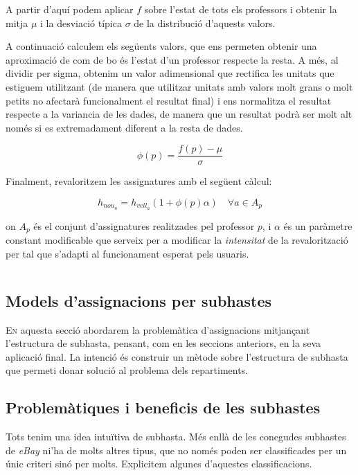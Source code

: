 \documentclass[10pt,twocolumn]{article}
\newcommand{\esp}{\text{ }}
\begin{document}
A partir d'aquí podem aplicar $f$ sobre l'estat de tots els professors i obtenir la mitja $\mu$ i la desviació típica $\sigma$ de la distribució d'aquests valors. 

A continuació calculem els següents valors, que ens permeten obtenir una aproximació de com de bo és l'estat d'un professor respecte la resta. A més, al dividir per sigma, obtenim un valor adimensional que rectifica les unitats que estiguem utilitzant (de manera que utilitzar unitats amb valors molt grans o molt petits no afectarà funcionalment el resultat final) i ens normalitza el resultat respecte a la variancia de les dades, de manera que un resultat podrà ser molt alt només si es extremadament diferent a la resta de dades.

$$\phi(p)=\dfrac{f(p)-\mu}{\sigma}$$

Finalment, revaloritzem les assignatures amb el següent càlcul:

$$h_{nou_a}=h_{vell_a}(1+\phi(p)\alpha) \quad \forall a \in A_p$$

on $A_p$ és el conjunt d'assignatures realitzades pel professor $p$, i $\alpha$ és un paràmetre constant modificable que serveix per a modificar la \textit{intensitat} de la revalorització per tal que s'adapti al funcionament esperat pels usuaris.


\newpage
$$
\esp
$$
\newpage
\begin{tcolorbox}[colframe=white,colback=redviolet!20,sharp corners=all,size=minimal,halign=center,valign=center]
	\section{Models d'assignacions per subhastes}
\end{tcolorbox}
\lettrine{E}n aquesta secció abordarem la problemàtica d'assignacions mitjançant l'estructura de subhasta, pensant, com en les seccions anteriors, en la seva aplicació final. La intenció  és construir un mètode sobre l'estructura de subhasta que permeti  donar solució al problema dels repartiments.
\subsection{Problemàtiques i beneficis de les subhastes}
Tots tenim una idea intuïtiva de subhasta. Més enllà de les conegudes subhastes de \textit{eBay}  ni'ha de molts altres tipus, que no només poden ser classificades per un únic criteri sinó per molts. Explicitem algunes d'aquestes classificacions.
\end{document}

